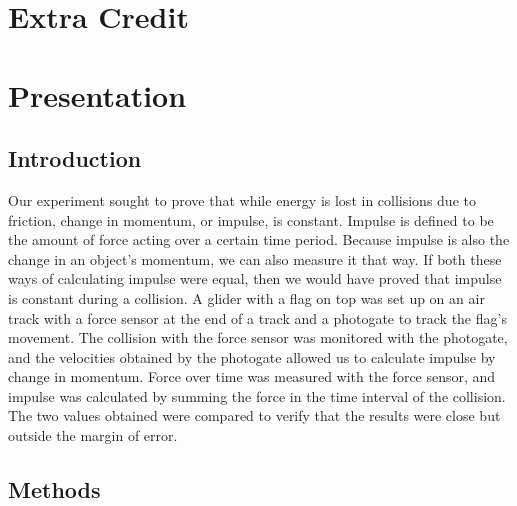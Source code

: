 \documentclass[11pt]{report}
\begin{document}
\section*{Extra Credit}

\section*{Presentation}

\subsection*{Introduction}
Our experiment sought to prove that while energy is lost in collisions due to
friction, change in momentum, or impulse, is constant.  Impulse is defined to be
the amount of force acting over a certain time period.  Because impulse is also the
change in an object's momentum, we can also measure it that way.  If both these
ways of calculating impulse were equal, then we would have proved that impulse
is constant during a collision.  A glider with a flag on top was set up on an
air track with a force sensor at the end of a track and a photogate to track the
flag's movement.  The collision with the force sensor was monitored with the
photogate, and the velocities obtained by the photogate allowed us to calculate
impulse by change in momentum.  Force over time was measured with the force
sensor, and impulse was calculated by summing the force in the time interval of
the collision.  The two values obtained were compared to verify that the results
were close but outside the margin of error.

\subsection*{Methods}
\end{document}
